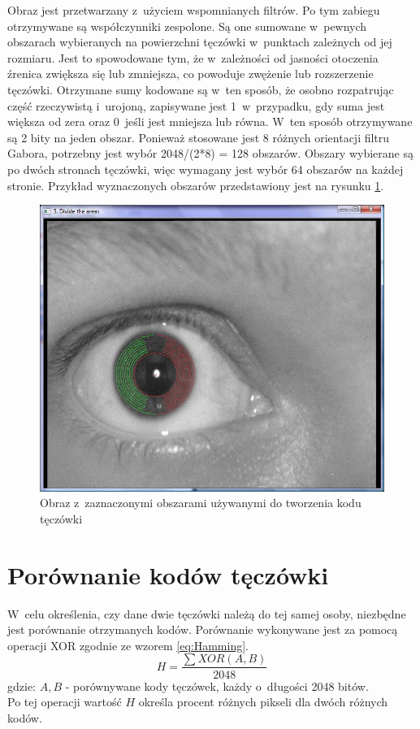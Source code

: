 Obraz jest przetwarzany z~użyciem wspomnianych filtrów. Po tym zabiegu otrzymywane są współczynniki zespolone. Są one sumowane w~pewnych obszarach wybieranych na powierzchni tęczówki w~punktach zależnych od jej rozmiaru. Jest to spowodowane tym, że w~zależności od jasności otoczenia źrenica zwiększa się lub zmniejsza, co powoduje zwężenie lub rozszerzenie tęczówki. Otrzymane sumy kodowane są w~ten sposób, że osobno rozpatrując część rzeczywistą i~urojoną, zapisywane jest 1~w~przypadku, gdy suma jest większa od zera oraz 0~jeśli jest mniejsza lub równa. W~ten sposób otrzymywane są 2 bity na jeden obszar. Ponieważ stosowane jest 8 różnych orientacji filtru Gabora, potrzebny jest wybór 2048/(2*8) = 128 obszarów. Obszary wybierane są po dwóch stronach tęczówki, więc wymagany jest wybór 64 obszarów na każdej stronie. Przykład wyznaczonych obszarów przedstawiony jest na rysunku \ref{fig:obszaryNasze}.

\begin{figure}[h!]
\begin{center}
\includegraphics[scale=0.5]{obszary.jpg}
\caption{Obraz z~zaznaczonymi obszarami używanymi do tworzenia kodu tęczówki}
\label{fig:obszaryNasze}
\end{center}
\end{figure}

\section{Porównanie kodów tęczówki}
\label{sec:porownanieKodow}
W~celu określenia, czy dane dwie tęczówki należą do tej samej osoby, niezbędne jest porównanie otrzymanych kodów. Porównanie wykonywane jest za pomocą operacji XOR zgodnie ze wzorem \ref{eq:Hamming}.
\begin{equation}
\label{eq:Hamming}
H = \frac{\sum XOR(A,B)}{2048}
\end{equation}
gdzie:
$A, B$ - porównywane kody tęczówek, każdy o~długości 2048 bitów.\\
Po tej operacji wartość $H$ określa procent różnych pikseli dla dwóch różnych kodów.

